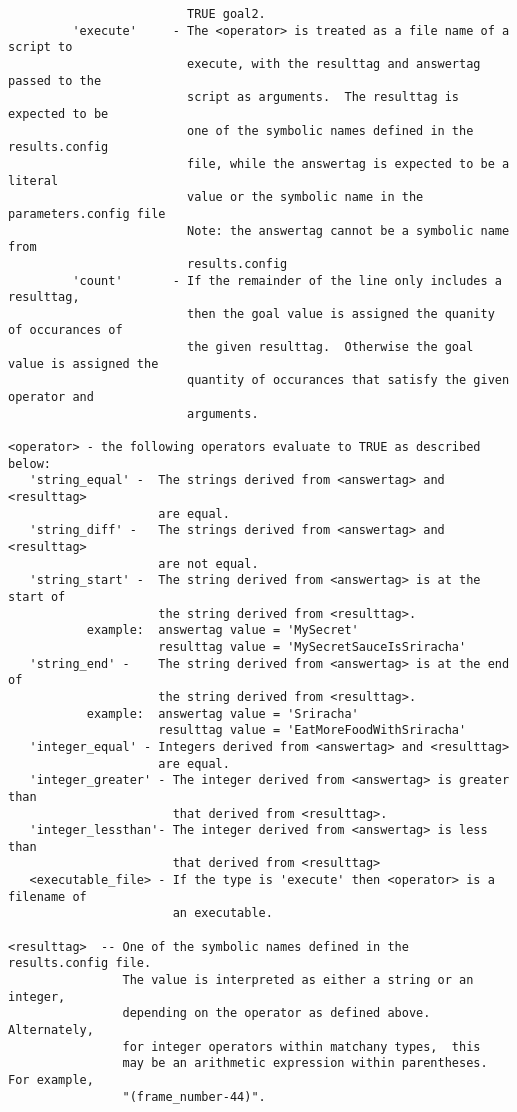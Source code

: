\documentclass[12pt]{article}
\begin{document}
\begin{verbatim}
                         TRUE goal2.
         'execute'     - The <operator> is treated as a file name of a script to 
                         execute, with the resulttag and answertag passed to the 
                         script as arguments.  The resulttag is expected to be 
                         one of the symbolic names defined in the results.config 
                         file, while the answertag is expected to be a literal 
                         value or the symbolic name in the parameters.config file 
                         Note: the answertag cannot be a symbolic name from 
                         results.config 
         'count'       - If the remainder of the line only includes a resulttag,
                         then the goal value is assigned the quanity of occurances of 
                         the given resulttag.  Otherwise the goal value is assigned the
                         quantity of occurances that satisfy the given operator and
                         arguments.
 
<operator> - the following operators evaluate to TRUE as described below:
   'string_equal' -  The strings derived from <answertag> and <resulttag>
                     are equal.
   'string_diff' -   The strings derived from <answertag> and <resulttag>
                     are not equal.
   'string_start' -  The string derived from <answertag> is at the start of 
                     the string derived from <resulttag>.
           example:  answertag value = 'MySecret'
                     resulttag value = 'MySecretSauceIsSriracha'
   'string_end' -    The string derived from <answertag> is at the end of
                     the string derived from <resulttag>.
           example:  answertag value = 'Sriracha'
                     resulttag value = 'EatMoreFoodWithSriracha'
   'integer_equal' - Integers derived from <answertag> and <resulttag>
                     are equal.
   'integer_greater' - The integer derived from <answertag> is greater than
                       that derived from <resulttag>.
   'integer_lessthan'- The integer derived from <answertag> is less than
                       that derived from <resulttag>
   <executable_file> - If the type is 'execute' then <operator> is a filename of 
                       an executable.
             
<resulttag>  -- One of the symbolic names defined in the results.config file.
                The value is interpreted as either a string or an integer,
                depending on the operator as defined above.  Alternately, 
                for integer operators within matchany types,  this
                may be an arithmetic expression within parentheses.  For example,
                "(frame_number-44)".
                

\end{verbatim}
\end{document}

